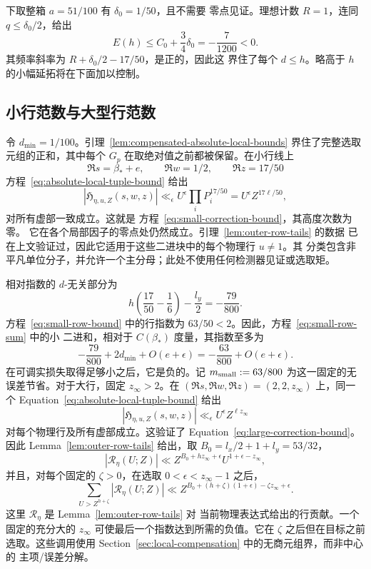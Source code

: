 \documentclass[11pt,a4paper]{article}
\numberwithin{equation}{section}
\numberwithin{figure}{section}
\theoremstyle{definition}
\theoremstyle{remark}
\begin{document}
下取整箱 \(a=51/100\) 有 \(\delta_0=1/50\)，且不需要
零点见证。理想计数 \(R=1\)，连同
\(q\le\delta_0/2\)，给出
\begin{equation}\label{eq:floor-bound}
 E(h)\le C_0+\frac34\delta_0=-\frac7{1200}<0.
\end{equation}
其频率斜率为 \(R+\delta_0/2-17/50\)，是正的，因此这
界住了每个 \(d\le h\)。略高于 \(h\) 的小幅延拓将在下面加以控制。

\subsection{小行范数与大型行范数}\label{sec:tails}

令 \(d_{\min}=1/100\)。引理~\ref{lem:compensated-absolute-local-bounds}
界住了完整选取元组的正和，其中每个 \(G_p\)
在取绝对值之前都被保留。在小行线上
\[
 \Re s=\beta_*+e,\qquad \Re w=1/2,\qquad \Re z=17/50
\]
方程~\eqref{eq:absolute-local-tuple-bound} 给出
\[
 |\mathfrak H_{\eta,u,Z}(s,w,z)|
 \ll_\epsilon U^\epsilon\prod_iP_i^{17/50}
 =U^\epsilon Z^{17\ell/50},
\]
对所有虚部一致成立。这就是
方程~\eqref{eq:small-correction-bound}，其高度次数为零。
它在各个局部因子的零点处仍然成立。引理~\ref{lem:outer-row-tails} 的数据
已在上文验证过，因此它适用于这些二进块中的每个物理行 \(u\ne1\)。其
分类包含非平凡单位分子，并允许一个主分母；此处不使用任何检测器见证或选取矩。

相对指数的 \(d\)-无关部分为
\begin{equation}\label{eq:small-frequency-margin}
 h\left(\frac{17}{50}-\frac16\right)-\frac{l_y}{2}
 =-\frac{79}{800}.
\end{equation}
方程~\eqref{eq:small-row-bound} 中的行指数为
\(63/50<2\)。因此，方程~\eqref{eq:small-row-sum} 中的小
二进和，相对于 \(C(\beta_*)\) 度量，其指数至多为
\[
 -\frac{79}{800}+2d_{\min}+O(e+\epsilon)
 =-\frac{63}{800}+O(e+\epsilon).
\]
在可调实损失取得足够小之后，它是负的。记 \(m_{\rm small}:=63/800\) 为这一固定的无误差节省。对于大行，固定 \(z_\infty>2\)。在
\((\Re s,\Re w,\Re z)=(2,2,z_\infty)\) 上，同一个
Equation~\eqref{eq:absolute-local-tuple-bound} 给出
\[
 |\mathfrak H_{\eta,u,Z}(s,w,z)|
 \ll_\epsilon U^\epsilon Z^{\ell z_\infty}
\]
对每个物理行及所有虚部成立。这验证了
Equation~\eqref{eq:large-correction-bound}。因此 Lemma~\ref{lem:outer-row-tails}
给出，取 \(B_0=l_x/2+1+l_y=53/32\)，
\[
 |\mathscr R_\eta(U;Z)|
 \ll Z^{B_0+hz_\infty+\epsilon}U^{1+\epsilon-z_\infty},
\]
并且，对每个固定的 \(\zeta>0\)，在选取
\(0<\epsilon<z_\infty-1\) 之后，
\[
 \sum_{U>Z^{h+\zeta}}|\mathscr R_\eta(U;Z)|
 \ll
 Z^{B_0+(h+\zeta)(1+\epsilon)-\zeta z_\infty+\epsilon}.
\]
这里 \(\mathscr R_\eta\) 是 Lemma~\ref{lem:outer-row-tails} 对
当前物理表达式给出的行贡献。一个固定的充分大的 \(z_\infty\)
可使最后一个指数达到所需的负值。它在
\(\zeta\) 之后但在目标之前选取。这些调用使用
Section~\ref{sec:local-compensation} 中的无商元组界，而非中心的
主项/误差分解。
\end{document}
